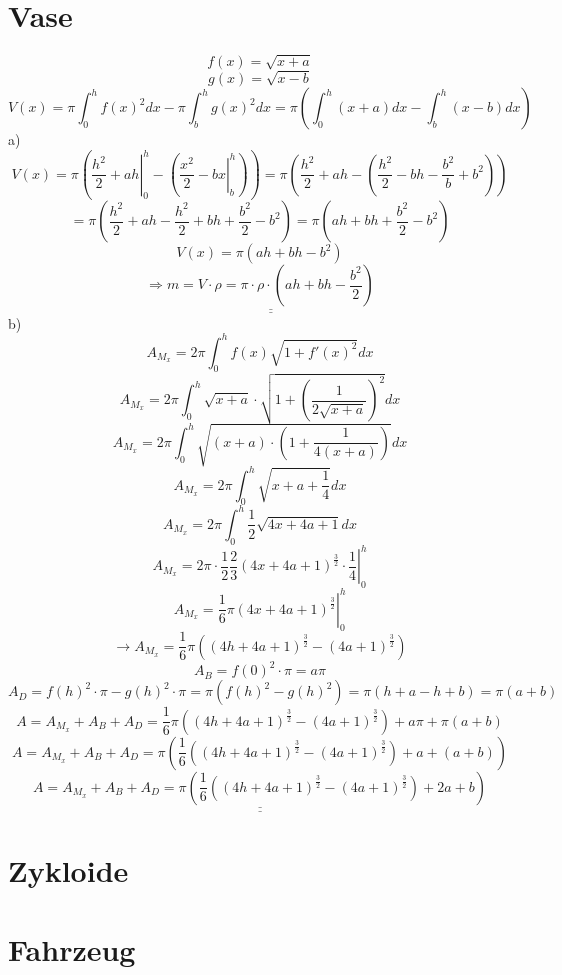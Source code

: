 \section{Vase}
\[ f(x) = \sqrt{x+a} \]
\[ g(x) = \sqrt{x-b} \]
\[ V(x) = \pi \int_0^h f(x)^2 dx - \pi \int_b^h g(x)^2dx = \pi \left( \int_0^h (x+a) dx - \int_b^h (x-b) dx\right) \]
a)
\[ V(x) = \pi\left(\left. \frac{h^2}{2} + ah \right|_0^h - \left(\left. \frac{x^2}{2} - bx \right|_b^h \right) \right) = \pi \left(  \frac{h^2}{2} + ah - \left( \frac{h^2}{2} - bh - \frac{b^2}{b} + b^2 \right)\right) \]
\[ = \pi \left(\frac{h^2}{2} + ah - \frac{h^2}{2} + bh + \frac{b^2}{2} - b^2\right) = \pi \left(ah + bh + \frac{b^2}{2} - b^2\right) \]
\[ V(x) = \pi \left(ah + bh - b^2\right) \]
\[ \Rightarrow \underline{\underline{m = V \cdot \rho = \pi \cdot \rho \cdot \left(ah + bh - \frac{b^2}{2}\right)}} \]
b)
\[ A_{M_x} = 2 \pi \int_0^h f(x) \sqrt{1 + f'(x)^2} dx \]
\[ A_{M_x} = 2 \pi \int_0^h \sqrt{x + a} \cdot \sqrt{1 + \left( \frac{1}{2 \sqrt{x + a}} \right)^2} dx \]
\[ A_{M_x} = 2 \pi \int_0^h \sqrt{(x + a) \cdot \left(1 + \frac{1}{4 (x + a)} \right)} dx \]
\[ A_{M_x} = 2 \pi \int_0^h \sqrt{x + a + \frac{1}{4}} dx \]
\[ A_{M_x} = 2 \pi \int_0^h \frac{1}{2} \sqrt{4x + 4a + 1} dx \]
\[ A_{M_x} = \left. 2 \pi \cdot \frac{1}{2} \frac{2}{3}\left( 4x + 4a + 1 \right)^{\frac{3}{2}} \cdot \frac{1}{4} \right|_0^h \]
\[ A_{M_x} = \left. \frac{1}{6} \pi \left(4x + 4a + 1\right)^{\frac{3}{2}} \right|_0^h \]
\[ \rightarrow A_{M_x} = \frac{1}{6} \pi \left(\left( 4h + 4a + 1 \right)^{\frac{3}{2}} - \left(4a + 1\right)^{\frac{3}{2}}\right) \]
\[ A_B = f(0)^2 \cdot \pi = a \pi \]
\[ A_D = f(h)^2 \cdot \pi - g(h)^2 \cdot \pi = \pi \left( f(h)^2 - g(h)^2 \right) = \pi \left( h + a - h + b \right) = \pi \left( a + b \right) \]
\[ A =  A_{M_x} + A_B + A_D = \frac{1}{6} \pi \left(\left( 4h + 4a + 1 \right)^{\frac{3}{2}} - \left(4a + 1\right)^{\frac{3}{2}}\right) + a \pi + \pi \left( a + b \right) \]
\[ A =  A_{M_x} + A_B + A_D = \pi \left(\frac{1}{6} \left(\left( 4h + 4a + 1 \right)^{\frac{3}{2}} - \left(4a + 1\right)^{\frac{3}{2}}\right) + a + \left( a + b \right)\right) \]
\[ \underline{\underline{A =  A_{M_x} + A_B + A_D = \pi \left(\frac{1}{6} \left(\left( 4h + 4a + 1 \right)^{\frac{3}{2}} - \left(4a + 1\right)^{\frac{3}{2}}\right) + 2a + b\right)}} \]

\section{Zykloide}

\section{Fahrzeug}
